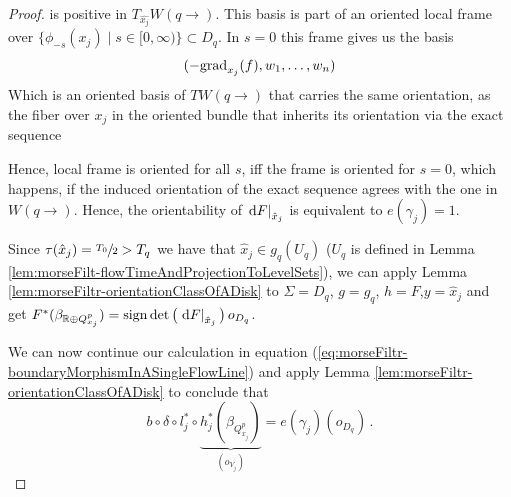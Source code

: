 \begin{proof}
is positive in $T_{\hat{x_j}}W(q\to)$.
 This basis is part of an oriented local frame over $\{\phi_{-s}(x_j)\mid s\in[0,\infty)\}\subset D_q$. In $s=0$ this frame gives us the basis
\begin{equation*}
	(-\mathrm{grad}_{x_j}(f),w_1,\dots,w_n)
\end{equation*} Which is an oriented basis of $TW(q\to)$ that carries the same orientation, as the fiber over $x_j$ in the oriented bundle that inherits its orientation via the exact sequence
\begin{center}
\end{center}
Hence, local frame is oriented for all $s$, iff the frame is oriented for $s=0$, which happens, if the induced orientation of the exact sequence agrees with the one in $W(q\to)$. Hence, the orientability of $\left.\mathop{}\!\mathrm{d} F\right|_{\hat{x}_j}$ is equivalent to $e(\gamma_j)=1$. 

Since $\tau(\hat{x}_j)=\sfrac{T_0}{2}>T_q$ we have that $\hat x_j \in g_q(U_q)$ ($U_q$ is defined in Lemma \ref{lem:morseFilt-flowTimeAndProjectionToLevelSets}), we can apply Lemma \ref{lem:morseFiltr-orientationClassOfADisk} to $\Sigma=D_q$, $g=g_q$, $h=F$,$y=\hat x_j$ and get $F^*(\beta_{\mathbb{R}\oplus Q^p_{x_j}})
   	=\mathrm{sign}\det\big(\left.\mathop{}\!\mathrm{d} F\right|_{\hat x_j}\big)\,o_{D_q}$.


We can now continue our calculation in equation (\ref{eq:morseFiltr-boundaryMorphismInASingleFlowLine}) and apply Lemma \ref{lem:morseFiltr-orientationClassOfADisk} to conclude that 
\begin{equation*}
	b\circ \delta \circ l_j^*\circ \underbrace{h_j^*(\beta_{Q_{x_j}^p})}_{(o_{V_j})}=e(\gamma_j)(o_{D_q})\,.
\end{equation*}

\end{proof}


